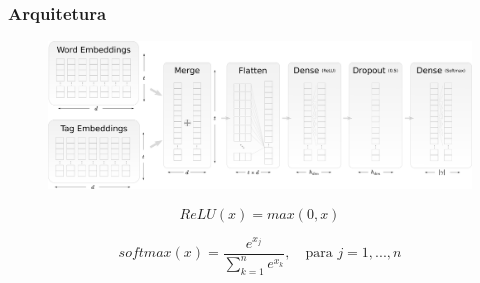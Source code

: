 \documentclass[10pt]{beamer}
\begin{document}
\begin{frame}[fragile]
\frametitle{Arquitetura}
  
  

  \begin{figure}
      \begin{center}
        \hspace*{-2em}
        \includegraphics[scale=0.14]{img/recursive_model_horizontal.pdf}
      \end{center}
  \end{figure}

\begin{equation} \nonumber
ReLU(x) = max(0, x)
\end{equation}

\begin{equation}  \nonumber
softmax(x) = \frac{e^{x_j}}{\sum_{k=1}^{n} e^{x_k}}, \quad \mbox{para } j = 1, ..., n
\end{equation}


\end{frame}
\end{document}
